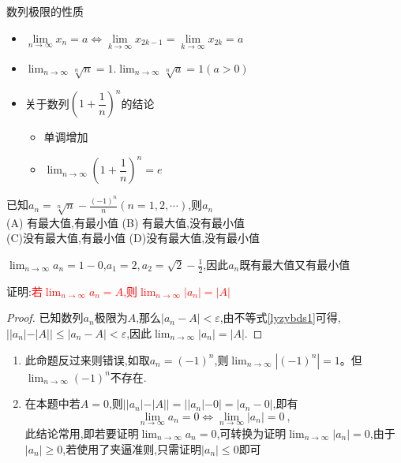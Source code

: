 \documentclass[8pt a4paper, oneside, UTF8]{ctexbook}
\begin{document}
\begin{sloppypar}
\begin{criterion}{数列极限的性质}{}
\begin{itemize}
            \item $\underset{n\to\infty}{\operatorname*{\lim}}x_n=a\Leftrightarrow\underset{k\to\infty}{\operatorname*{\lim}}x_{2k-1}=\underset{k\to\infty}{\operatorname*{\lim}}x_{2k}=a$
            \item \textbf{$\lim_{n \to \infty }\sqrt[n]{n}=1.\lim_{n \to \infty} \sqrt[n]{a}=1(a>0)$}\label{jl1}
            \item 关于数列$(1+\dfrac{1}{n})^n$的结论
            \begin{itemize}
                \item 单调增加
                \item $\lim_{n\to \infty}(1+\dfrac{1}{n})^n=e$
            \end{itemize}
        \end{itemize}
    \end{criterion}
    \begin{problem}
        已知$a_{n}=\sqrt[n]{n}-\frac{(-1)^{n}}{n}(n=1,2,\cdots)$,则${a_n}$\\
        (A) 有最大值,有最小值 \quad (B) 有最大值,没有最小值 \\ (C)没有最大值,有最小值 \quad (D)没有最大值,没有最小值
    \end{problem}
    \begin{solution}
        $\lim_{n\to \infty}a_n=1-0$,$a_1=2,a_2=\sqrt{2}-\frac{1}{2}$,因此$a_n$既有最大值又有最小值
    \end{solution}
    \begin{problem}
        证明:\textcolor{red}{若$\lim_{n \to \infty}a_n=A$,则$\lim_{n \to \infty}|a_n|=|A|$}
    \end{problem}
    \begin{proof}
        已知数列$a_n$极限为$A$,那么$|a_n-A|<\varepsilon$,由不等式\ref{lyzybds1}可得,$||a_n|-|A||\leqslant|a_n -A|<\varepsilon$,因此$\lim_{n \to \infty }|a_n|=|A|$.
        \end{proof}
    \begin{note}
        \begin{enumerate}
            \item 此命题反过来则错误,如取$a_n=(-1)^n$,则$\lim_{n\to\infty}\left|(-1)^n\right|=1$。但$\lim_{n\to\infty}(-1)^n$不存在.
            \item 在本题中若$A=0$,则$||a_n|-|A||=||a_n|-0|=|a_n-0|$,即有
            $$
            \lim_{n\to\infty}a_{n}=0\Leftrightarrow\lim_{n\to\infty}\lvert a_{n}\rvert=0\:,
            $$
            此结论常用,即若要证明$\lim _{n \to \infty}a_n=0$,可转换为证明$\lim_{n \to \infty}|a_n|=0$,由于$|a_n| \geq 0$,若使用了夹逼准则,只需证明$|a_n|\leqslant 0$即可

\end{enumerate}
\end{note}
\end{sloppypar}
\end{document}
